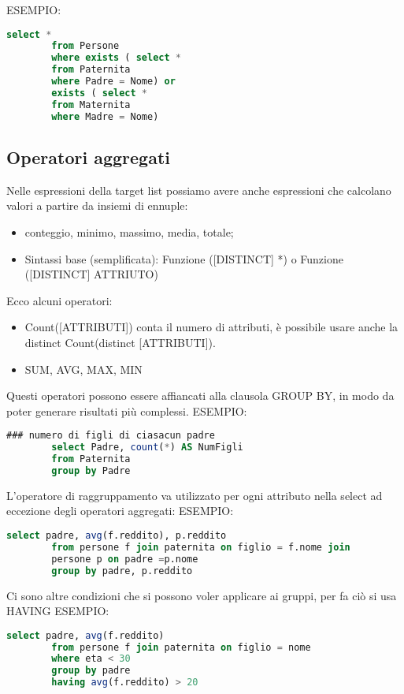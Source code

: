\documentclass{article}
\begin{document}
ESEMPIO:
\begin{center}
\centering
    \begin{lstlisting}[language=SQL]
         select *
        from Persone
        where exists ( select *
        from Paternita
        where Padre = Nome) or
        exists ( select *
        from Maternita
        where Madre = Nome)
    \end{lstlisting}
\end{center}
\subsection{Operatori aggregati}
Nelle espressioni della target list possiamo avere anche espressioni che calcolano valori a partire da insiemi di ennuple:
\begin{itemize}
    \item conteggio, minimo, massimo, media, totale;
    \item Sintassi base (semplificata): Funzione ([DISTINCT] *) o Funzione ([DISTINCT] ATTRIUTO)
\end{itemize}
Ecco alcuni operatori:
\begin{itemize}
    \item Count([ATTRIBUTI]) conta il numero di attributi, è possibile usare anche la distinct Count(distinct [ATTRIBUTI]).
    \item SUM, AVG, MAX, MIN
\end{itemize}
Questi operatori possono essere affiancati alla clausola GROUP BY, in modo da poter generare risultati più complessi.
ESEMPIO:
\begin{center}
    \begin{lstlisting}[language=SQL]
        ### numero di figli di ciasacun padre
        select Padre, count(*) AS NumFigli
        from Paternita
        group by Padre
    \end{lstlisting}
\end{center}
L'operatore di raggruppamento va utilizzato per ogni attributo nella select ad eccezione degli operatori aggregati:
ESEMPIO:
\begin{center}
    \begin{lstlisting}[language=SQL]
         select padre, avg(f.reddito), p.reddito
        from persone f join paternita on figlio = f.nome join
        persone p on padre =p.nome
        group by padre, p.reddito
    \end{lstlisting}
\end{center}
Ci sono altre condizioni che si possono voler applicare ai gruppi, per fa ciò si usa HAVING
ESEMPIO:
\begin{center}
    \begin{lstlisting}[language=SQL]
        select padre, avg(f.reddito)
        from persone f join paternita on figlio = nome
        where eta < 30
        group by padre
        having avg(f.reddito) > 20
    \end{lstlisting}
\end{center}
\end{document}
